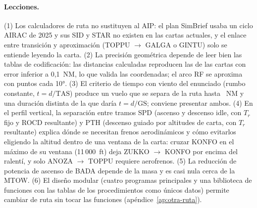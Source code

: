 \documentclass[11pt,a4paper]{article}
\begin{document}
\paragraph{Lecciones.} (1) Los calculadores de ruta no sustituyen al AIP: el plan SimBrief usaba un ciclo AIRAC de 2025 y sus SID y STAR no existen en las cartas actuales, y el enlace entre transición y aproximación (TOPPU $\rightarrow$ GALGA o GINTU) solo se entiende leyendo la carta. (2) La precisión geométrica depende de leer bien las tablas de codificación: las distancias calculadas reproducen las de las cartas con error inferior a 0,1~NM, lo que valida las coordenadas; el arco RF se aproxima con puntos cada 10°. (3) El criterio de tiempo con viento del enunciado (rumbo constante, $t=d/\mathrm{TAS}$) produce un vuelo que se separa de la ruta hasta \enrDevMax~NM y una duración distinta de la que daría $t=d/\mathrm{GS}$; conviene presentar ambos. (4) En el perfil vertical, la separación entre tramos SPD (ascenso y descenso idle, con $T_r$ fijo y ROCD resultante) y PTH (descenso guiado por altitudes de carta, con $T_r$ resultante) explica dónde se necesitan frenos aerodinámicos y cómo evitarlos eligiendo la altitud dentro de una ventana de la carta: cruzar KONFO en el máximo de su ventana (11\,000~ft) deja ZUKKO $\rightarrow$ KONFO por encima del ralentí, y solo ANOZA $\rightarrow$ TOPPU requiere aerofrenos. (5) La reducción de potencia de ascenso de BADA depende de la masa y es casi nula cerca de la MTOW. (6) El diseño modular (cuatro programas principales y una biblioteca de funciones con las tablas de los procedimientos como únicos datos) permite cambiar de ruta sin tocar las funciones (apéndice~\ref{ap:otra-ruta}).
\end{document}
